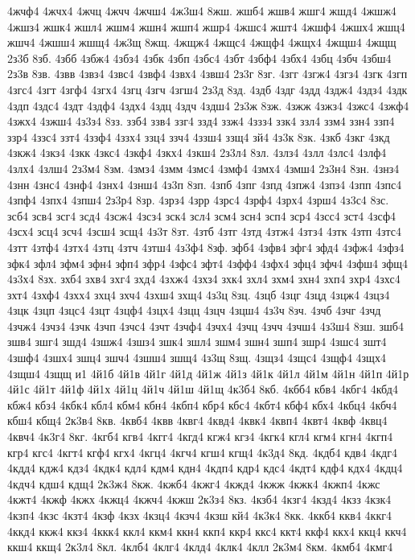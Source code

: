 {4жчф4
4жчх4
4жчц
4жчч
4жчш4
4ж3ш4
8жш.
жшб4
жшв4
жшг4
жшд4
4жшж4
4жшз4
жшк4
жшл4
жшм4
жшн4
жшп4
жшр4
4жшс4
жшт4
4жшф4
4жшх4
жшц4
жшч4
4жшш4
жшщ4
4ж3щ
8жщ.
4жщж4
4жщс4
4жщф4
4жщх4
4жщш4
4жщщ
2з3б
8зб.
4збб
4збж4
4збз4
4збк
4збп
4збс4
4збт
4збф4
4збх4
4збц
4збч
4збш4
2з3в
8зв.
4звв
4звз4
4звс4
4звф4
4звх4
4звш4
2з3г
8зг.
4згг
4згж4
4згз4
4згк
4згп
4згс4
4згт
4згф4
4згх4
4згц
4згч
4згш4
2з3д
8зд.
4здб
4здг
4здд
4здж4
4здз4
4здк
4здп
4здс4
4здт
4здф4
4здх4
4здц
4здч
4здш4
2з3ж
8зж.
4зжж
4зжз4
4зжс4
4зжф4
4зжх4
4зжш4
4з3з4
8зз.
ззб4
ззв4
ззг4
ззд4
ззж4
4ззз4
ззк4
ззл4
ззм4
ззн4
ззп4
ззр4
4ззс4
ззт4
4ззф4
4ззх4
ззц4
ззч4
4ззш4
ззщ4
зй4
4з3к
8зк.
4зкб
4зкг
4зкд
4зкж4
4зкз4
4зкк
4зкс4
4зкф4
4зкх4
4зкш4
2з3л4
8зл.
4злз4
4злл
4злс4
4злф4
4злх4
4злш4
2з3м4
8зм.
4змз4
4змм
4змс4
4змф4
4змх4
4змш4
2з3н4
8зн.
4знз4
4знн
4знс4
4знф4
4знх4
4знш4
4з3п
8зп.
4зпб
4зпг
4зпд
4зпж4
4зпз4
4зпп
4зпс4
4зпф4
4зпх4
4зпш4
2з3р4
8зр.
4зрз4
4зрр
4зрс4
4зрф4
4зрх4
4зрш4
4з3с4
8зс.
зсб4
зсв4
зсг4
зсд4
4зсж4
4зсз4
зск4
зсл4
зсм4
зсн4
зсп4
зср4
4зсс4
зст4
4зсф4
4зсх4
зсц4
зсч4
4зсш4
зсщ4
4з3т
8зт.
4зтб
4зтг
4зтд
4зтж4
4зтз4
4зтк
4зтп
4зтс4
4зтт
4зтф4
4зтх4
4зтц
4зтч
4зтш4
4з3ф4
8зф.
зфб4
4зфв4
зфг4
зфд4
4зфж4
4зфз4
зфк4
зфл4
зфм4
зфн4
зфп4
зфр4
4зфс4
зфт4
4зфф4
4зфх4
зфц4
зфч4
4зфш4
зфщ4
4з3х4
8зх.
зхб4
зхв4
зхг4
зхд4
4зхж4
4зхз4
зхк4
зхл4
зхм4
зхн4
зхп4
зхр4
4зхс4
зхт4
4зхф4
4зхх4
зхц4
зхч4
4зхш4
зхщ4
4з3ц
8зц.
4зцб
4зцг
4зцд
4зцж4
4зцз4
4зцк
4зцп
4зцс4
4зцт
4зцф4
4зцх4
4зцц
4зцч
4зцш4
4з3ч
8зч.
4зчб
4зчг
4зчд
4зчж4
4зчз4
4зчк
4зчп
4зчс4
4зчт
4зчф4
4зчх4
4зчц
4зчч
4зчш4
4з3ш4
8зш.
зшб4
зшв4
зшг4
зшд4
4зшж4
4зшз4
зшк4
зшл4
зшм4
зшн4
зшп4
зшр4
4зшс4
зшт4
4зшф4
4зшх4
зшц4
зшч4
4зшш4
зшщ4
4з3щ
8зщ.
4зщз4
4зщс4
4зщф4
4зщх4
4зщш4
4зщщ
и1
4й1б
4й1в
4й1г
4й1д
4й1ж
4й1з
4й1к
4й1л
4й1м
4й1н
4й1п
4й1р
4й1с
4й1т
4й1ф
4й1х
4й1ц
4й1ч
4й1ш
4й1щ
4к3б4
8кб.
4кбб4
кбв4
4кбг4
4кбд4
кбж4
кбз4
4кбк4
кбл4
кбм4
кбн4
4кбп4
кбр4
кбс4
4кбт4
кбф4
кбх4
4кбц4
4кбч4
кбш4
кбщ4
2к3в4
8кв.
4квб4
4квв
4квг4
4квд4
4квк4
4квп4
4квт4
4квф
4квц4
4квч4
4к3г4
8кг.
4кгб4
кгв4
4кгг4
4кгд4
кгж4
кгз4
4кгк4
кгл4
кгм4
кгн4
4кгп4
кгр4
кгс4
4кгт4
кгф4
кгх4
4кгц4
4кгч4
кгш4
кгщ4
4к3д4
8кд.
4кдб4
кдв4
4кдг4
4кдд4
кдж4
кдз4
4кдк4
кдл4
кдм4
кдн4
4кдп4
кдр4
кдс4
4кдт4
кдф4
кдх4
4кдц4
4кдч4
кдш4
кдщ4
2к3ж4
8кж.
4кжб4
4кжг4
4кжд4
4кжж
4кжк4
4кжп4
4кжс
4кжт4
4кжф
4кжх
4кжц4
4кжч4
4кжш
2к3з4
8кз.
4кзб4
4кзг4
4кзд4
4кзз
4кзк4
4кзп4
4кзс
4кзт4
4кзф
4кзх
4кзц4
4кзч4
4кзш
кй4
4к3к4
8кк.
4ккб4
ккв4
4ккг4
4ккд4
ккж4
ккз4
4ккк4
ккл4
ккм4
ккн4
ккп4
ккр4
ккс4
ккт4
ккф4
ккх4
ккц4
ккч4
ккш4
ккщ4
2к3л4
8кл.
4клб4
4клг4
4клд4
4клк4
4клл
2к3м4
8км.
4кмб4
4кмг4
}
